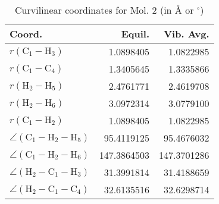 \begin{table}
\centering
\caption{Curvilinear coordinates for Mol. 2 (in \AA{} or $^\circ$)}
\begin{tabular}{lrr}
       Coord.         &             Equil. &          Vib. Avg. \\
\hline
$r(\text{C}_{1} - \text{H}_{3})$ &          1.0898405 &          1.0822985 \\
$r(\text{C}_{1} - \text{C}_{4})$ &          1.3405645 &          1.3335866 \\
$r(\text{H}_{2} - \text{H}_{5})$ &          2.4761771 &          2.4619708 \\
$r(\text{H}_{2} - \text{H}_{6})$ &          3.0972314 &          3.0779100 \\
$r(\text{C}_{1} - \text{H}_{2})$ &          1.0898405 &          1.0822985 \\
$\angle(\text{C}_{1} - \text{H}_{2} - \text{H}_{5})$ &         95.4119125 &         95.4676032 \\
$\angle(\text{C}_{1} - \text{H}_{2} - \text{H}_{6})$ &        147.3864503 &        147.3701286 \\
$\angle(\text{H}_{2} - \text{C}_{1} - \text{H}_{3})$ &         31.3991814 &         31.4188659 \\
$\angle(\text{H}_{2} - \text{C}_{1} - \text{C}_{4})$ &         32.6135516 &         32.6298714 \\
\end{tabular}
\end{table}

